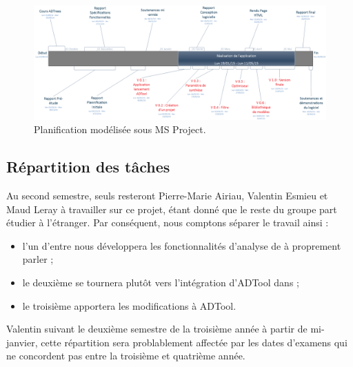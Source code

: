 		\begin{landscape}
			\begin{figure}
				\centering
				\includegraphics[height=0.60\textwidth]{figure/planification.png}
				\caption{Planification modélisée sous MS Project.}
				\label{fig:planif}
			\end{figure}
		\end{landscape}

	\subsection{Répartition des tâches}
		Au second semestre, seuls resteront Pierre-Marie {\sc Airiau}, Valentin {\sc Esmieu} et Maud {\sc Leray} à travailler sur ce projet, étant donné que le reste du groupe part étudier à l'étranger. Par conséquent, nous comptons séparer le travail ainsi :
		\begin{itemize} 
			\item l'un d'entre nous développera les fonctionnalités d'analyse de \glasir{} à proprement parler ;
			\item le deuxième se tournera plutôt vers l'intégration d'ADTool dans \glasir{} ;
			\item le troisième apportera les modifications à ADTool.
		\end{itemize} Valentin suivant le deuxième semestre de la troisième année à partir de mi-janvier, cette répartition sera problablement affectée par les dates d'examens qui ne concordent pas entre la troisième et quatrième année. %

